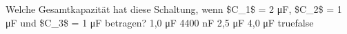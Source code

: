     {Welche Gesamtkapazität hat diese Schaltung, wenn \$C\_1\$ = 2 μF, \$C\_2\$ = 1 μF und \$C\_3\$ = 1 μF betragen? }
    {1,0 μF}
    {4400 nF}
    {2,5 μF}
    {4,0 μF}
    {true}{false}